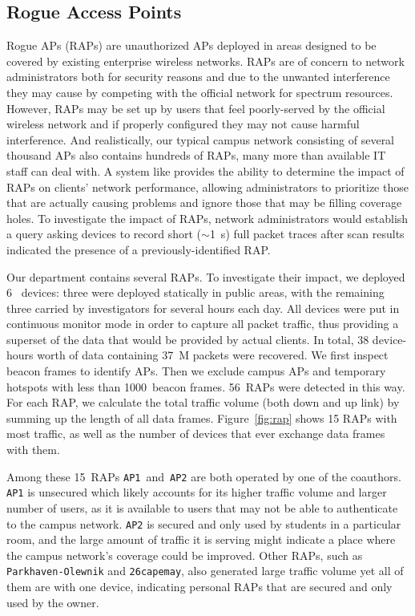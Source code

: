 \subsection{Rogue Access Points}
\label{subsec-rogue}

Rogue APs (RAPs) are unauthorized APs deployed in areas designed to be
covered by existing enterprise wireless networks. RAPs are of concern to
network administrators both for security reasons and due to the unwanted
interference they may cause by competing with the official network for
spectrum resources. However, RAPs may be set up by users that feel
poorly-served by the official wireless network and if properly configured
they may not cause harmful interference. And realistically, our typical
campus network consisting of several thousand APs also contains hundreds of
RAPs, many more than available IT staff can deal with. A system like
\PS{} provides the ability to determine the impact of RAPs on clients'
network performance, allowing administrators to prioritize those that are
actually causing problems and ignore those that may be filling coverage
holes. To investigate the impact of RAPs, network administrators would
establish a \PS{} query asking devices to record short ($\sim$1~s) full packet
traces after scan results indicated the presence of a previously-identified
RAP.

Our department contains several RAPs. To investigate their impact, we
deployed 6~\PS{} devices: three were deployed statically in public areas,
with the remaining three carried by investigators for several hours each day.
All devices were put in continuous monitor mode in order to capture all
packet traffic, thus providing a superset of the data that would be provided
by actual \PS{} clients. In total, 38 device-hours worth of data containing
37~M packets were recovered. We first inspect beacon frames to identify APs.
Then we exclude campus APs and temporary hotspots with less than 1000~beacon
frames. 56~RAPs were detected in this way. For each RAP, we calculate the
total traffic volume (both down and up link) by summing up the length of all
data frames. Figure~\ref{fig:rap} shows 15 RAPs with most traffic, as well as
the number of devices that ever exchange data frames with them.

Among these 15~RAPs \texttt{AP1}~and~\texttt{AP2} are both operated by one of the
coauthors. \texttt{AP1} is unsecured which likely accounts for its higher
traffic volume and larger number of users, as it is available to users that
may not be able to authenticate to the campus network. \texttt{AP2} is
secured and only used by students in a particular room, and the large amount
of traffic it is serving might indicate a place where the campus network's
coverage could be improved. Other RAPs, such as \texttt{Parkhaven-Olewnik}
and \texttt{26capemay}, also generated large traffic volume yet all of them
are with one device, indicating personal RAPs that are secured and only used
by the owner.

